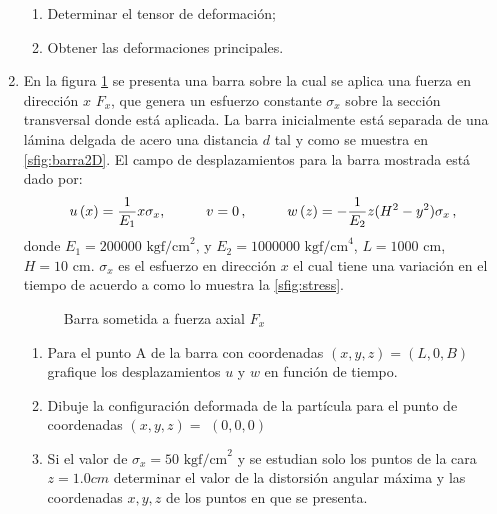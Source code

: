 \documentclass[../notas medios.tex]{subfiles}
\begin{document}
\begin{enumerate}
\begin{enumerate}
\item Determinar el tensor de deformaci\'on;
\item Obtener las deformaciones principales.
\end{enumerate}

\item \label{punto12_d} En la figura \cref{fig:barra} se presenta una barra 
sobre la cual se aplica una fuerza en dirección $x$ $F_{x}$, que genera  un 
esfuerzo constante $\sigma_x$ sobre la sección transversal donde está aplicada. 
La barra inicialmente está  separada de una lámina delgada de acero una 
distancia $d$ tal y como se muestra en \cref{sfig:barra2D}. El campo de 
desplazamientos para la barra mostrada está dado por:
\[u\left( x \right) = \dfrac{1}{E_1}  x \sigma_x, \hspace{10mm} v=0\, , 
\hspace{10mm}
w\left( z \right) = - \dfrac{1}{E_2}  z (H^2 - y^2) \sigma_x\, ,\]
donde $E_1 = 200000 \text{ kgf/cm}^2$,   y $E_2 = 1000000 \text{ kgf/cm}^4$, $L 
= 1000 \text{ cm}$, $H = 10 \text{ cm}$. $\sigma_x$ es el esfuerzo en dirección 
$x$ el cual tiene una variación en el tiempo de acuerdo a como lo muestra la  
\cref{sfig:stress}.  

\begin{figure}[H]
	\centering
	\hspace{0.7cm}
	\hspace{0.7cm}
    \caption{Barra sometida a fuerza axial $F_{x}$}
	\label{fig:barra}
\end{figure}


\begin{enumerate}
\item Para el punto A de la barra con coordenadas  $(x,y,z) = (L, 0, B)$ 
grafique los desplazamientos $u$ y $w$ en función de tiempo. 

\item Dibuje la configuración deformada de la partícula para el punto de 
coordenadas $(x,y,z)=$ $(0,0,0)$ 

\item  Si el valor de $\sigma_x = 50 \text{ kgf/cm}^2$ y se estudian solo 
los puntos de la cara $ z = 1.0 cm$ determinar el valor de la distorsión 
angular máxima y las coordenadas $x,y,z$ de los puntos  en que se 
presenta. 
	

\end{enumerate}
\end{enumerate}
\end{document}
